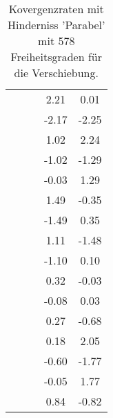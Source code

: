 \begin{table}
\begin{tabular}{c|cc|cc|}
\multicolumn{1}{|c|}{} & \multicolumn{1}{|c|}{} & \multicolumn{1}{|c|}{} & \multicolumn{1}{|c|}{      2.21} & \multicolumn{1}{|c|}{      0.01} \\ 
\multicolumn{1}{|c|}{} & \multicolumn{1}{|c|}{} & \multicolumn{1}{|c|}{} & \multicolumn{1}{|c|}{     -2.17} & \multicolumn{1}{|c|}{     -2.25} \\ 
\multicolumn{1}{|c|}{} & \multicolumn{1}{|c|}{} & \multicolumn{1}{|c|}{} & \multicolumn{1}{|c|}{      1.02} & \multicolumn{1}{|c|}{      2.24} \\ 
\multicolumn{1}{|c|}{} & \multicolumn{1}{|c|}{} & \multicolumn{1}{|c|}{} & \multicolumn{1}{|c|}{     -1.02} & \multicolumn{1}{|c|}{     -1.29} \\ 
\multicolumn{1}{|c|}{} & \multicolumn{1}{|c|}{} & \multicolumn{1}{|c|}{} & \multicolumn{1}{|c|}{     -0.03} & \multicolumn{1}{|c|}{      1.29} \\ 
\multicolumn{1}{|c|}{} & \multicolumn{1}{|c|}{} & \multicolumn{1}{|c|}{} & \multicolumn{1}{|c|}{      1.49} & \multicolumn{1}{|c|}{     -0.35} \\ 
\multicolumn{1}{|c|}{} & \multicolumn{1}{|c|}{} & \multicolumn{1}{|c|}{} & \multicolumn{1}{|c|}{     -1.49} & \multicolumn{1}{|c|}{      0.35} \\ 
\multicolumn{1}{|c|}{} & \multicolumn{1}{|c|}{} & \multicolumn{1}{|c|}{} & \multicolumn{1}{|c|}{      1.11} & \multicolumn{1}{|c|}{     -1.48} \\ 
\multicolumn{1}{|c|}{} & \multicolumn{1}{|c|}{} & \multicolumn{1}{|c|}{} & \multicolumn{1}{|c|}{     -1.10} & \multicolumn{1}{|c|}{      0.10} \\ 
\multicolumn{1}{|c|}{} & \multicolumn{1}{|c|}{} & \multicolumn{1}{|c|}{} & \multicolumn{1}{|c|}{      0.32} & \multicolumn{1}{|c|}{     -0.03} \\ 
\multicolumn{1}{|c|}{} & \multicolumn{1}{|c|}{} & \multicolumn{1}{|c|}{} & \multicolumn{1}{|c|}{     -0.08} & \multicolumn{1}{|c|}{      0.03} \\ 
\multicolumn{1}{|c|}{} & \multicolumn{1}{|c|}{} & \multicolumn{1}{|c|}{} & \multicolumn{1}{|c|}{      0.27} & \multicolumn{1}{|c|}{     -0.68} \\ 
\multicolumn{1}{|c|}{} & \multicolumn{1}{|c|}{} & \multicolumn{1}{|c|}{} & \multicolumn{1}{|c|}{      0.18} & \multicolumn{1}{|c|}{      2.05} \\ 
\multicolumn{1}{|c|}{} & \multicolumn{1}{|c|}{} & \multicolumn{1}{|c|}{} & \multicolumn{1}{|c|}{     -0.60} & \multicolumn{1}{|c|}{     -1.77} \\ 
\multicolumn{1}{|c|}{} & \multicolumn{1}{|c|}{} & \multicolumn{1}{|c|}{} & \multicolumn{1}{|c|}{     -0.05} & \multicolumn{1}{|c|}{      1.77} \\ 
\multicolumn{1}{|c|}{} & \multicolumn{1}{|c|}{} & \multicolumn{1}{|c|}{} & \multicolumn{1}{|c|}{      0.84} & \multicolumn{1}{|c|}{     -0.82} \\ 
\hline 
\end{tabular}\caption{Kovergenzraten mit Hinderniss 'Parabel' mit 578 Freiheitsgraden für die Verschiebung.}\label{tab:Rate_Parabel_level3}
\end{table} 

